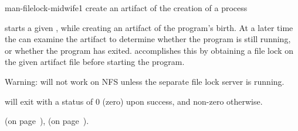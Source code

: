 \begin{ManPage}{}{man-filelock-midwife}{1}
{create an artifact of the creation of a process}


\Synopsis {}


\Description {} starts a given , while
creating an artifact of the program's birth.  At a later time the
 can examine the artifact to determine whether
the program is still running, or whether the program has exited.
accomplishes this by obtaining a file lock on the given artifact file
before starting the program.

Warning:  will not work on NFS
unless the separate file lock server is running.

\begin{Options}
\end{Options}

\ExitStatus
{} will exit with a status of 0 (zero) upon
success, and non-zero otherwise.

\SeeAlso
{} (on page~\pageref{man-uniq-pid-midwife}),
 (on page~\pageref{man-filelock-undertaker}).

\end{ManPage}
